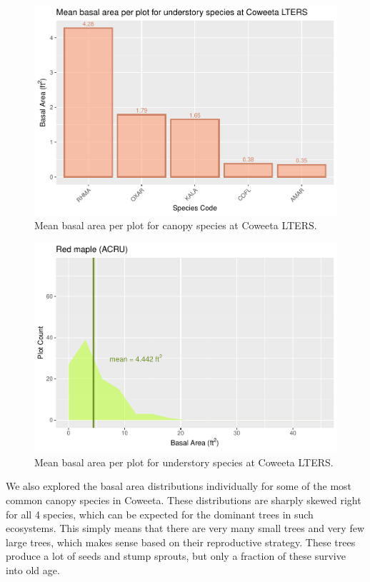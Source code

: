 \documentclass[
  12pt,
]{article}
\begin{document}
\begin{figure}
\centering
\includegraphics{ProjectDraft_files/figure-latex/unnamed-chunk-3-1.pdf}
\caption{Mean basal area per plot for canopy species at Coweeta LTERS.}
\end{figure}

\newpage

\begin{figure}
\centering
\includegraphics{ProjectDraft_files/figure-latex/unnamed-chunk-4-1.pdf}
\caption{Mean basal area per plot for understory species at Coweeta
LTERS.}
\end{figure}

We also explored the basal area distributions individually for some of
the most common canopy species in Coweeta. These distributions are
sharply skewed right for all 4 species, which can be expected for the
dominant trees in such ecosystems. This simply means that there are very
many small trees and very few large trees, which makes sense based on
their reproductive strategy. These trees produce a lot of seeds and
stump sprouts, but only a fraction of these survive into old age.
\end{document}
